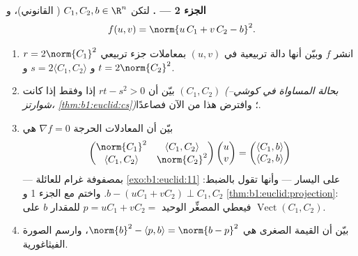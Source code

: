 \begin{problem}
\medskip
\noindent\textbf{الجزء 2 --- .} لتكن $C_1,
C_2, b \in \R^n$ ( القانوني)، و
\[
f(u, v) = \norm{u\,C_1 + v\,C_2 - b}^2 .
\]
\begin{enumerate}[resume]
  \item انشر $f$ وبيّن أنها دالة تربيعية في $(u,
        v)$ بمعاملات جزء تربيعي $r = 2\norm{C_1}^2$ و
        $s = 2\langle C_1, C_2\rangle$ و $t = 2\norm{C_2}^2$.
  \item بيّن أن $rt - s^2 > 0$ إذا وفقط إذا كانت $(C_1, C_2)$
         \emph{(بحالة المساواة في كوشي--شوارتز،
        \cref{thm:b1:euclid:cs})}؛ وافترض هذا من الآن فصاعدًا.
  \item بيّن أن المعادلات الحرجة $\nabla f = 0$ هي
        \emph{}
        \[
        \begin{pmatrix}
        \norm{C_1}^2 & \langle C_1, C_2\rangle\\
        \langle C_1, C_2\rangle & \norm{C_2}^2
        \end{pmatrix}
        \begin{pmatrix} u\\ v\end{pmatrix}
        =
        \begin{pmatrix} \langle C_1, b\rangle\\ \langle C_2,
        b\rangle\end{pmatrix}
        \]
        --- بمصفوفة غرام للعائلة \cref{exo:b1:euclid:11} على
        اليسار --- وأنها تقول بالضبط: $b - (uC_1 + vC_2)
        \perp C_1, C_2$. واختم مع الجزء 1 و
        \cref{thm:b1:euclid:projection}: فيعطي المصغِّر الوحيد
        $p = uC_1 + vC_2 =$  للمقدار
        $b$ على $\operatorname{Vect}(C_1, C_2)$.
  \item بيّن أن القيمة الصغرى هي $\norm{b}^2 - \langle p,
        b\rangle = \norm{b - p}^2$، وارسم الصورة
        الفيثاغورية.
\end{enumerate}


\end{problem}
